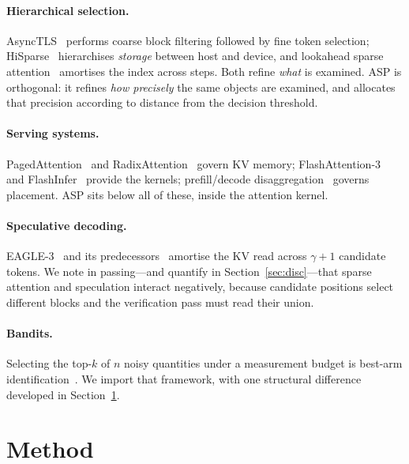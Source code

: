 \documentclass[sigconf,nonacm,11pt]{acmart}
\begin{document}
\paragraph{Hierarchical selection.} AsyncTLS~\cite{hu2026asynctls} performs
coarse block filtering followed by fine token selection;
HiSparse~\cite{hisparse2026} hierarchises \emph{storage} between host and device,
and lookahead sparse attention~\cite{lsa2026} amortises the index across steps.
Both refine \emph{what} is examined. ASP is orthogonal: it refines \emph{how
precisely} the same objects are examined, and allocates that precision according
to distance from the decision threshold.

\paragraph{Serving systems.} PagedAttention~\cite{kwon2023vllm} and
RadixAttention~\cite{zheng2024sglang} govern KV memory;
FlashAttention-3~\cite{shah2024flashattention3} and
FlashInfer~\cite{ye2025flashinfer} provide the kernels; prefill/decode
disaggregation~\cite{zhong2024distserve,qin2024mooncake,agrawal2024sarathi}
governs placement. ASP sits below all of these, inside the attention kernel.

\paragraph{Speculative decoding.} EAGLE-3~\cite{li2025eagle3} and its
predecessors~\cite{leviathan2023speculative} amortise the KV read across
$\gamma+1$ candidate tokens. We note in passing---and quantify in
Section~\ref{sec:disc}---that sparse attention and speculation interact
negatively, because candidate positions select different blocks and the
verification pass must read their union.

\paragraph{Bandits.} Selecting the top-$k$ of $n$ noisy quantities under a
measurement budget is best-arm identification~\cite{bubeck2009pure,%
carpentier2016tight,karnin2013almost}. We import that framework, with one
structural difference developed in Section~\ref{sec:method}.

\section{Method}\label{sec:method}
\end{document}
